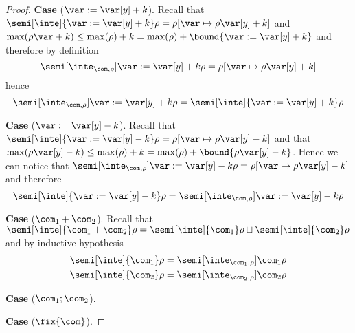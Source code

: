 \begin{proof}
  \medskip

  \noindent
  \textbf{Case} (\(\var := \var[y] + k\)).
  Recall that
  \({\semi[\inte]{\var := \var[y] + k}\rho} = {\rho[\var \mapsto
    \rho\var[y] + k]}\) and
  \({\max(\rho\var + k)} \leq {\max(\rho) + k} = {\max(\rho) +
    \bound{\var := \var[y] + k}}\)
  and therefore by definition
  \begin{equation*}
    \semi[\inte_{\com,\rho}]{\var := \var[y] + k}\rho = \rho[\var \mapsto \rho\var[y] + k]
  \end{equation*}
  hence
  \begin{equation*}
    \semi[\inte_{\com,\rho}]{\var := \var[y] + k}\rho = \semi[\inte]{\var := \var[y] + k}\rho
  \end{equation*}

  \medskip

  \noindent
  \textbf{Case} (\(\var := \var[y] - k\)).
  Recall that
  \({\semi[\inte]{\var := \var[y] - k}\rho} = {\rho[\var \mapsto
    \rho\var[y] - k]}\) and that
  \({\max(\rho\var[y] - k)} \leq {\max(\rho) + k} = {\max(\rho) +
    \bound{\rho\var[y] - k}}\). Hence we can notice that
  \({\semi[\inte_{\com,\rho}]{\var := \var[y] - k}\rho} = {\rho[\var
    \mapsto \rho\var[y] - k]}\) and therefore
  \begin{equation*}
    \semi[\inte]{\var := \var[y] - k}\rho = \semi[\inte_{\com,\rho}]{\var := \var[y] - k}\rho
  \end{equation*}

  \medskip

  \noindent
  \textbf{Case} (\(\com_1 + \com_2\)).
  Recall that
  \({\semi[\inte]{\com_1 + \com_2}\rho} = {\semi[\inte]{\com_1}\rho}
  \sqcup {\semi[\inte]{\com_2}\rho}\) and by inductive hypothesis
  \begin{align*}
    \semi[\inte]{\com_1}\rho & = \semi[\inte_{\com_1, \rho}]{\com_1}\rho \\
    \semi[\inte]{\com_2}\rho & = \semi[\inte_{\com_2, \rho}]{\com_2}\rho \\
  \end{align*}
  
  \medskip

  \noindent
  \textbf{Case} (\(\com_1 ; \com_2\)).

  \medskip

  \noindent
  \textbf{Case} (\(\fix{\com}\)).
  

\end{proof}
